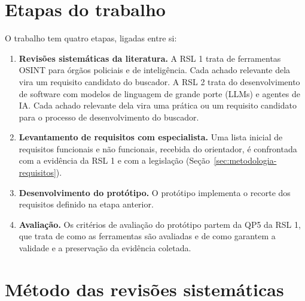 \section{Etapas do trabalho}
\label{sec:metodologia-etapas}

O trabalho tem quatro etapas, ligadas entre si:

\begin{enumerate}
	\item \textbf{Revisões sistemáticas da literatura.} A RSL 1 trata de
	ferramentas OSINT para órgãos policiais e de inteligência. Cada achado
	relevante dela vira um requisito candidato do buscador. A RSL 2 trata do
	desenvolvimento de software com modelos de linguagem de grande porte
	(LLMs) e agentes de IA. Cada achado relevante dela vira uma prática ou um
	requisito candidato para o processo de desenvolvimento do buscador.
	\item \textbf{Levantamento de requisitos com especialista.} Uma lista
	inicial de requisitos funcionais e não funcionais, recebida do orientador,
	é confrontada com a evidência da RSL 1 e com a legislação
	(Seção~\ref{sec:metodologia-requisitos}).
	\item \textbf{Desenvolvimento do protótipo.} O protótipo implementa o
	recorte dos requisitos definido na etapa anterior.
	\item \textbf{Avaliação.} Os critérios de avaliação do protótipo partem da
	QP5 da RSL 1, que trata de como as ferramentas são avaliadas e de como
	garantem a validade e a preservação da evidência coletada.
\end{enumerate}



\section{Método das revisões sistemáticas}
\label{sec:metodologia-rsl}

